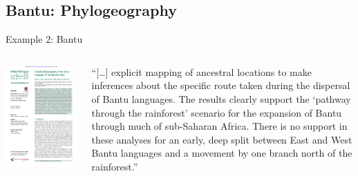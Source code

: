 \documentclass[9pt]{beamer}
\begin{document}
\subsection{Bantu: Phylogeography}
\begin{frame}{Example 2: Bantu}
  \begin{columns}
    \begin{column}{0.5\textwidth}
      \includegraphics[width=\textwidth,page=5,trim={5cm 11.5cm 3cm 1cm},clip]{bantu.pdf}
    \end{column}
    \begin{column}{0.5\textwidth}
      \footnotesize “[…] explicit mapping of ancestral locations to make
      inferences about the specific route taken during the dispersal
      of Bantu languages. The results clearly support the ‘pathway
      through the rainforest’ scenario for the expansion of Bantu
      through much of sub-Saharan Africa. There is no support
      in these analyses for an early, deep split between East and
      West Bantu languages and a movement by one branch
      north of the rainforest.”
    \end{column}
  \end{columns}
\end{frame}
\end{document}
